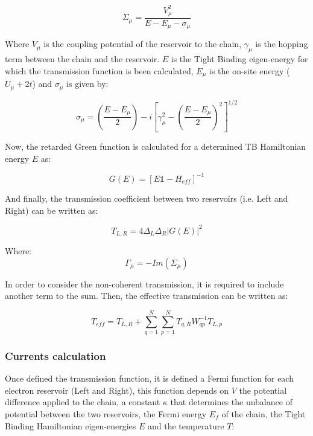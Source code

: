 \documentclass[12pt]{article}
\begin{document}
\begin{equation}\label{self_e}
\Sigma_{\mu} = \frac{V_{\mu}^{2}}{E-E_{\mu}-\sigma_{\mu}}
\end{equation}

Where $V_{\mu}$ is the coupling potential of the reservoir to the chain, $\gamma_{\mu}$ is the hopping term between the chain and the reservoir. $E$ is the Tight Binding eigen-energy for which the transmission function is been calculated, $E_{\mu}$ is the on-site energy ($U_{\mu}+2t$) and $\sigma_{\mu}$ is given by:

\begin{equation}\label{sigma}
\sigma_{\mu} = \left(\frac{E - E_{\mu}}{2}\right) - i\left[ \gamma_{\mu}^{2} - \left(\frac{E - E_{\mu}}{2}\right)^{2} \right]^{1/2}
\end{equation}

Now, the retarded Green function is calculated for a determined TB Hamiltonian energy $E$ as:

\begin{equation}\label{Green}
G(E) = [E \mathds{1} - H_{eff}]^{-1}
\end{equation}

And finally, the transmission coefficient between two reservoirs (i.e. Left and Right) can be written as:

\begin{equation}\label{TLR}
	T_{L,R} = 4\Delta_{L}\Delta_{R}|G(E)|^{2}
\end{equation}

Where:
\begin{equation}\label{ImSigma}
	\Gamma_{\mu} = -Im(\Sigma_{\mu})
\end{equation}

In order to consider the non-coherent transmission, it is required to include another term to the sum. Then, the effective transmission can be written as:

\begin{equation}\label{Teff}
	T_{eff} = T_{L, R} + \sum_{q=1}^{N}\sum_{p=1}^{N} T_{q, R} W_{qp}^{-1} T_{L, p}
\end{equation}

\subsubsection{Currents calculation}

Once defined the transmission function, it is defined a Fermi function for each electron reservoir (Left and Right), this function depends on $V$ the potential difference applied to the chain, a constant $\kappa$ that determines the unbalance of potential between the two reservoirs, the Fermi energy $E_{f}$ of the chain, the Tight Binding Hamiltonian eigen-energies $E$ and the temperature $T$:
\end{document}
